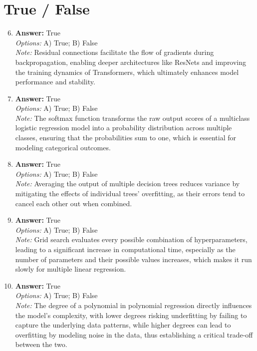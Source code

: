 \documentclass[12pt]{article}
\begin{document}
\section*{True / False}
\begin{enumerate}[label=\arabic*.]
\setcounter{enumi}{5}
\item \textbf{Answer:} True
\\ \textit{Options:} A) True; B) False
\\ \textit{Note:} Residual connections facilitate the flow of gradients during backpropagation, enabling deeper architectures like ResNets and improving the training dynamics of Transformers, which ultimately enhances model performance and stability.
\item \textbf{Answer:} True
\\ \textit{Options:} A) True; B) False
\\ \textit{Note:} The softmax function transforms the raw output scores of a multiclass logistic regression model into a probability distribution across multiple classes, ensuring that the probabilities sum to one, which is essential for modeling categorical outcomes.
\item \textbf{Answer:} True
\\ \textit{Options:} A) True; B) False
\\ \textit{Note:} Averaging the output of multiple decision trees reduces variance by mitigating the effects of individual trees' overfitting, as their errors tend to cancel each other out when combined.
\item \textbf{Answer:} True
\\ \textit{Options:} A) True; B) False
\\ \textit{Note:} Grid search evaluates every possible combination of hyperparameters, leading to a significant increase in computational time, especially as the number of parameters and their possible values increases, which makes it run slowly for multiple linear regression.
\item \textbf{Answer:} True
\\ \textit{Options:} A) True; B) False
\\ \textit{Note:} The degree of a polynomial in polynomial regression directly influences the model's complexity, with lower degrees risking underfitting by failing to capture the underlying data patterns, while higher degrees can lead to overfitting by modeling noise in the data, thus establishing a critical trade-off between the two.
\end{enumerate}
\end{document}
